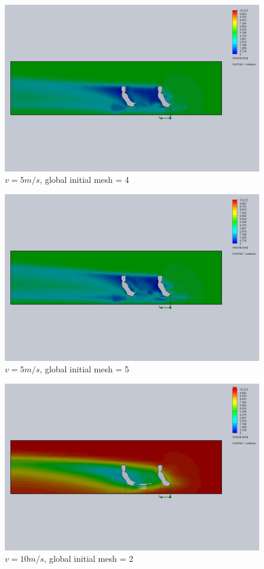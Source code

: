 \documentclass[11pt]{article}
\begin{document}
\begin{figure}
\includegraphics[width=\textwidth]{gm_4_rf_7_v05.png}
\caption{$v = 5 m/s$, global initial mesh = 4}
\end{figure}

\begin{figure}
\includegraphics[width=\textwidth]{gm_5_rf_7_v05.png}
\caption{$v = 5 m/s$, global initial mesh = 5}
\end{figure}

\begin{figure}
\includegraphics[width=\textwidth]{gm_2_rf_7_v10.png}
\caption{$v = 10 m/s$, global initial mesh = 2}
\end{figure}
\end{document}
